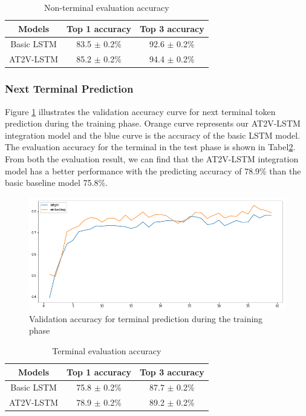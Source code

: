 \documentclass[T, E]{compsoft}
\begin{document}
\begin{table}
\centering
\begin{tabular}{ccc}
\hline
Models& Top 1 accuracy& Top 3 accuracy\\
\hline
Basic LSTM& 83.5 $\pm$ 0.2\% & 92.6 $\pm$ 0.2\% \\
AT2V-LSTM& 85.2 $\pm$ 0.2\% & 94.4 $\pm$ 0.2\% \\
\hline
\end{tabular}
\caption{Non-terminal evaluation accuracy}
\label{table:non-terminal-evalution-accuracy}
\end{table}



\subsubsection{Next Terminal Prediction} 
Figure \ref{fig:valid_accuracy_for_terminal} illustrates the validation accuracy curve for next terminal token prediction during the training phase. 
Orange curve represents our AT2V-LSTM integration model and the blue curve is the accuracy of the basic LSTM model. 
The evaluation accuracy for the terminal in the test phase is shown in Tabel\ref{table:terminal-evalution-accuracy}. 
From both the evaluation result, we can find that the AT2V-LSTM integration model has a better performance with the predicting accuracy of 78.9\% than the basic baseline model 75.8\%. 


\begin{figure}[!ht]
\centering
\includegraphics[scale=0.25]{pictures/tt_valid_accuracy.png}
\caption{Validation accuracy for terminal prediction during the training phase}
\label{fig:valid_accuracy_for_terminal}
\end{figure}


\begin{table}
\centering
\begin{tabular}{ccc}
\hline
Models& Top 1 accuracy& Top 3 accuracy\\
\hline
Basic LSTM& 75.8 $\pm$ 0.2\% & 87.7 $\pm$ 0.2\% \\
AT2V-LSTM& 78.9 $\pm$ 0.2\% & 89.2 $\pm$ 0.2\% \\
\hline
\end{tabular}
\caption{Terminal evaluation accuracy}
\label{table:terminal-evalution-accuracy}
\end{table}
\end{document}
